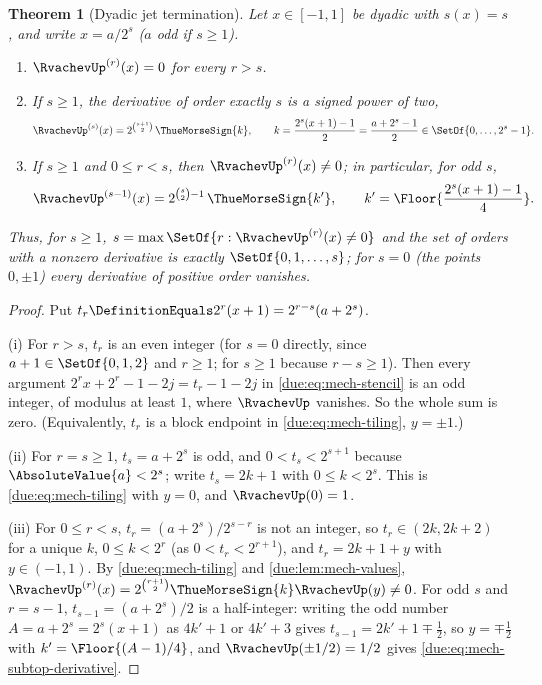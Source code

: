 \documentclass[11pt,oneside]{article}
\theoremstyle{plain}
\newtheorem{theorem}{Theorem}[section]
\theoremstyle{definition}
\theoremstyle{remark}
\newcommand{\dep}[1]{s\!\left(#1\right)}                    %
\begin{document}
\begin{theorem}[Dyadic jet termination]
\label{due:thm:mech-jet-termination}
Let \(x\in[-1,1]\) be dyadic with \(\dep{x}=s\), and write \(x=a/2^{s}\)
(\(a\) odd if \(s\ge1\)).
\begin{enumerate}[label=\textup{(\roman*)}]
\item \(\RvachevUp^{(r)}(x)=0\) for every \(r>s\).
\item If \(s\ge1\), the derivative of order exactly \(s\) is a signed power
of two,
\begin{equation}
 \RvachevUp^{(s)}(x)=2^{\binom{s+1}{2}}\,\ThueMorseSign{k},
 \qquad k=\frac{2^{s}(x+1)-1}{2}=\frac{a+2^{s}-1}{2}\in\SetOf{0,\ldots,2^{s}-1}.
 \label{due:eq:mech-top-derivative}
\end{equation}
\item If \(s\ge1\) and \(0\le r<s\), then \(\RvachevUp^{(r)}(x)\ne0\); in
particular, for odd \(s\),
\begin{equation}
 \RvachevUp^{(s-1)}(x)=2^{\binom{s}{2}-1}\,\ThueMorseSign{k'},
 \qquad k'=\Floor{\frac{2^{s}(x+1)-1}{4}}.
 \label{due:eq:mech-subtop-derivative}
\end{equation}
\end{enumerate}
Thus, for \(s\ge1\), \(s=\max\SetOf{r:\RvachevUp^{(r)}(x)\ne0}\) and the
set of orders with a nonzero derivative is exactly \(\SetOf{0,1,\ldots,s}\);
for \(s=0\) (the points \(0,\pm1\)) every derivative of positive order
vanishes.
\end{theorem}

\begin{proof}
Put \(t_r\DefinitionEquals2^{r}(x+1)=2^{r-s}(a+2^{s})\).

(i) For \(r>s\), \(t_r\) is an even integer (for \(s=0\) directly, since
\(a+1\in\SetOf{0,1,2}\) and \(r\ge1\); for \(s\ge1\) because
\(r-s\ge1\)).  Then every argument \(2^{r}x+2^{r}-1-2j=t_r-1-2j\) in
\cref{due:eq:mech-stencil} is an odd integer, of modulus at least \(1\),
where \(\RvachevUp\) vanishes.  So the whole sum is zero.  (Equivalently,
\(t_r\) is a block endpoint in \cref{due:eq:mech-tiling}, \(y=\pm1\).)

(ii) For \(r=s\ge1\), \(t_s=a+2^{s}\) is odd, and \(0<t_s<2^{s+1}\) because
\(\AbsoluteValue{a}<2^{s}\); write \(t_s=2k+1\) with \(0\le k<2^{s}\).  This
is \cref{due:eq:mech-tiling} with \(y=0\), and \(\RvachevUp(0)=1\).

(iii) For \(0\le r<s\), \(t_r=(a+2^{s})/2^{s-r}\) is not an integer, so
\(t_r\in(2k,2k+2)\) for a unique \(k\), \(0\le k<2^{r}\) (as
\(0<t_r<2^{r+1}\)), and \(t_r=2k+1+y\) with \(y\in(-1,1)\).  By
\cref{due:eq:mech-tiling} and \cref{due:lem:mech-values},
\(\RvachevUp^{(r)}(x)=2^{\binom{r+1}{2}}\ThueMorseSign{k}\RvachevUp(y)\ne0\).
For odd \(s\) and \(r=s-1\), \(t_{s-1}=(a+2^{s})/2\) is a half-integer:
writing the odd number \(A=a+2^{s}=2^{s}(x+1)\) as \(4k'+1\) or \(4k'+3\)
gives \(t_{s-1}=2k'+1\mp\tfrac12\), so \(y=\mp\tfrac12\) with
\(k'=\Floor{(A-1)/4}\), and \(\RvachevUp(\pm1/2)=1/2\) gives
\cref{due:eq:mech-subtop-derivative}.
\end{proof}
\end{document}
